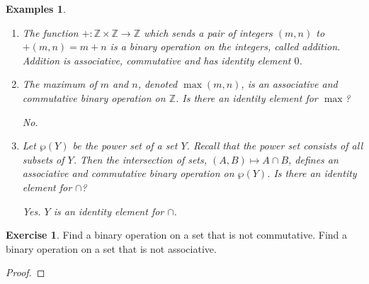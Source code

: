 \documentclass[11pt]{article}
\newcommand{\bbZ}{\mathbb{Z}}
\newcommand{\arr}{\longrightarrow}
\newtheorem{examples}[theorem]{Examples}
\theoremstyle{definition}
\newtheorem{exercise}[theorem]{Exercise}
\numberwithin{equation}{subsection}
\begin{document}
\begin{examples}  \hspace{1in}
	\begin{enumerate}
		\item  The function $+ \colon \bbZ \times \bbZ \arr \bbZ$ which sends a pair of integers $(m, n)$ to $+(m, n) = m + n$ is a binary operation on the integers, called addition.  Addition is associative, commutative and has identity element $0$.
		
		\item  The maximum of $m$ and $n$, denoted $\max(m, n)$, is an associative and commutative binary operation on $\bbZ$.  Is there an identity element for $\max$? 

        No.
		
		\item  Let $\wp(Y)$ be the power set of a set $Y$.  Recall that the power set consists of all subsets of $Y$.  Then the intersection of sets, $(A, B) \mapsto A \cap B$, defines an associative and commutative binary operation on $\wp(Y)$.  Is there an identity element for $\cap$?

Yes. $Y$ is an identity element for $\cap$.

        
	\end{enumerate}
\end{examples}

\begin{exercise}  
	Find a binary operation on a set that is not commutative.  
	Find a binary operation on a set that is not associative.
    
\begin{proof}


\renewcommand\qedsymbol{QED}
\end{proof}

\end{exercise}
\end{document}
